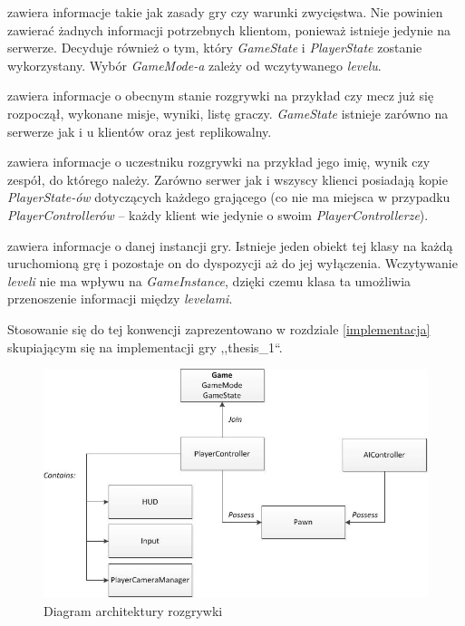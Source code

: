 \documentclass[multip]{SGGW-thesis}
\begin{document}
\begin{description}[itemsep=1\itemsep,parsep=1\parsep,partopsep=1\partopsep,topsep=1\topsep]
\item[GameMode:] zawiera informacje takie jak zasady gry czy warunki zwycięstwa. Nie powinien zawierać żadnych informacji potrzebnych klientom, ponieważ istnieje jedynie na serwerze. Decyduje również o tym, który {\em GameState} i {\em PlayerState} zostanie wykorzystany. Wybór {\em GameMode-a} zależy od wczytywanego {\em levelu}.
\item[GameState:] zawiera informacje o obecnym stanie rozgrywki na przykład czy mecz już się rozpoczął, wykonane misje, wyniki, listę graczy. {\em GameState} istnieje zarówno na serwerze jak i u klientów oraz jest replikowalny.
\item[PlayerState:] zawiera informacje o uczestniku rozgrywki na przykład jego imię, wynik czy zespół, do którego należy. Zarówno serwer jak i wszyscy klienci posiadają kopie {\em PlayerState-ów} dotyczących każdego grającego (co nie ma miejsca w przypadku {\em PlayerControllerów} -- każdy klient wie jedynie o swoim {\em PlayerControllerze}).
\item[GameInstance:] zawiera informacje o danej instancji gry. Istnieje jeden obiekt tej klasy na każdą uruchomioną grę i pozostaje on do dyspozycji aż do jej wyłączenia. Wczytywanie {\em leveli} nie ma wpływu na {\em GameInstance}, dzięki czemu klasa ta umożliwia przenoszenie informacji między {\em levelami}.
\end{description}
Stosowanie się do tej konwencji zaprezentowano w rozdziale \ref{implementacja} skupiającym się na implementacji gry ,,thesis\_1``.

\begin{figure}
	\centering
		\includegraphics[width=1\textwidth]{figures/gameplay_chart.jpg}
	\caption{Diagram architektury rozgrywki}
	\label{fig-gameplay-chart}
\end{figure}
\end{document}
